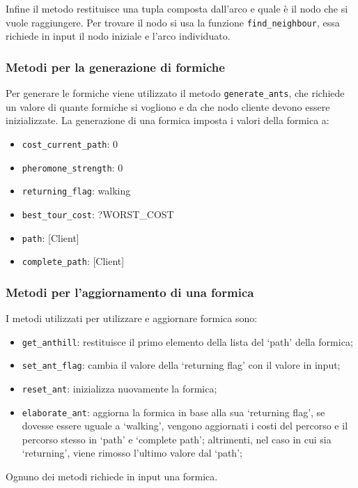 Infine il metodo restituisce una tupla composta dall'arco e quale è il nodo che si vuole raggiungere. Per trovare il nodo si usa la funzione \texttt{find\_neighbour}, essa richiede in input il nodo iniziale e l'arco individuato.

\subsubsection{Metodi per la generazione di formiche}
Per generare le formiche viene utilizzato il metodo \texttt{generate\_ants}, che richiede un valore di quante formiche si vogliono e da che nodo cliente devono essere inizializzate.
La generazione di una formica imposta i valori della formica a:
\begin{itemize}
    \item \texttt{cost\_current\_path}: 0
    \item \texttt{pheromone\_strength}: 0
    \item \texttt{returning\_flag}: walking
    \item \texttt{best\_tour\_cost}: ?WORST\_COST
    \item \texttt{path}: [Client]
    \item \texttt{complete\_path}: [Client]
\end{itemize}

\subsubsection{Metodi per l'aggiornamento di una formica}
I metodi utilizzati per utilizzare e aggiornare formica sono:
\begin{itemize}
    \item \texttt{get\_anthill}: restituisce il primo elemento della lista del `path' della formica;
    \item \texttt{set\_ant\_flag}: cambia il valore della `returning flag' con il valore in input;
    \item \texttt{reset\_ant}: inizializza nuovamente la formica;
    \item \texttt{elaborate\_ant}: aggiorna la formica in base alla sua `returning flag', se dovesse essere uguale a `walking', vengono aggiornati i costi del percorso e il percorso stesso in `path' e `complete path'; altrimenti, nel caso in cui sia `returning', viene rimosso l'ultimo valore dal `path';
\end{itemize}
Ognuno dei metodi richiede in input una formica.

